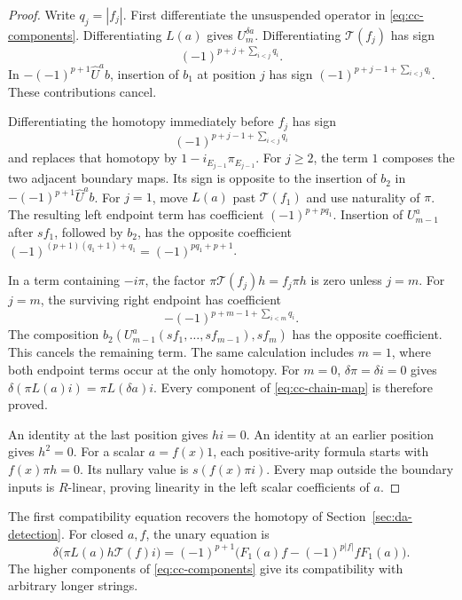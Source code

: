 \begin{proof}
Write \(q_j=|f_j|\). First differentiate the unsuspended
operator in \eqref{eq:cc-components}.
Differentiating \(L(a)\) gives \(U^{\delta a}_m\).
Differentiating \(\mathcal T(f_j)\) has sign
\[
 (-1)^{p+j+\sum_{i<j}q_i}.
\]
In \(-(-1)^{p+1}\widehat U^a b\), insertion of \(b_1\) at
position \(j\) has sign
\((-1)^{p+j-1+\sum_{i<j}q_i}\).
These contributions cancel.

Differentiating the homotopy immediately before \(f_j\)
has sign
\[
 (-1)^{p+j-1+\sum_{i<j}q_i}
\]
and replaces that homotopy by \(1-i_{E_{j-1}}\pi_{E_{j-1}}\).
For \(j\geq2\), the term \(1\) composes the two adjacent
boundary maps. Its sign is opposite to the insertion of
\(b_2\) in \(-(-1)^{p+1}\widehat U^a b\).
For \(j=1\), move \(L(a)\) past \(\mathcal T(f_1)\) and use
naturality of \(\pi\). The resulting left endpoint term has
coefficient \((-1)^{p+pq_1}\).
Insertion of \(U^a_{m-1}\) after \(sf_1\), followed by \(b_2\),
has the opposite coefficient
\((-1)^{(p+1)(q_1+1)+q_1}=(-1)^{pq_1+p+1}\).

In a term containing \(-i\pi\), the factor
\(\pi\mathcal T(f_j)h=f_j\pi h\) is zero unless \(j=m\).
For \(j=m\), the surviving right endpoint has coefficient
\[
 -(-1)^{p+m-1+\sum_{i<m}q_i}.
\]
The composition
\(b_2(U^a_{m-1}(sf_1,\ldots,sf_{m-1}),sf_m)\)
has the opposite coefficient. This cancels the remaining term.
The same calculation includes \(m=1\), where both endpoint
terms occur at the only homotopy.
For \(m=0\), \(\delta\pi=\delta i=0\) gives
\(\delta(\pi L(a)i)=\pi L(\delta a)i\).
Every component of \eqref{eq:cc-chain-map} is therefore proved.

An identity at the last position gives \(hi=0\).
An identity at an earlier position gives \(h^2=0\).
For a scalar \(a=f(x)1\), each positive-arity formula starts
with \(f(x)\pi h=0\). Its nullary value is \(s(f(x)\pi i)\).
Every map outside the boundary inputs is \(R\)-linear, proving
linearity in the left scalar coefficients of \(a\).
\end{proof}

The first compatibility equation recovers the homotopy of
Section~\ref{sec:da-detection}. For closed \(a,f\), the unary
equation is
\[
 \delta\bigl(\pi L(a)h\mathcal T(f)i\bigr)
   =(-1)^{p+1}\bigl(F_1(a)f-(-1)^{p|f|}fF_1(a)\bigr).
\]
The higher components of \eqref{eq:cc-components} give its
compatibility with arbitrary longer strings.

